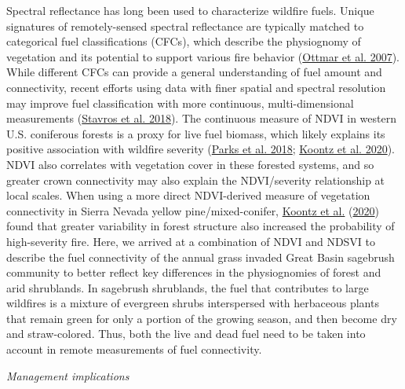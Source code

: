 \documentclass[
  12pt,
]{article}
\begin{document}
Spectral reflectance has long been used to characterize wildfire fuels.
Unique signatures of remotely-sensed spectral reflectance are typically
matched to categorical fuel classifications (CFCs), which describe the
physiognomy of vegetation and its potential to support various fire
behavior (\protect\hyperlink{ref-Ottmar2007}{Ottmar et al. 2007}). While
different CFCs can provide a general understanding of fuel amount and
connectivity, recent efforts using data with finer spatial and spectral
resolution may improve fuel classification with more continuous,
multi-dimensional measurements
(\protect\hyperlink{ref-Stavros2018}{Stavros et al. 2018}). The
continuous measure of NDVI in western U.S. coniferous forests is a proxy
for live fuel biomass, which likely explains its positive association
with wildfire severity (\protect\hyperlink{ref-Parks2018}{Parks et al.
2018}; \protect\hyperlink{ref-Koontz2020}{Koontz et al. 2020}). NDVI
also correlates with vegetation cover in these forested systems, and so
greater crown connectivity may also explain the NDVI/severity
relationship at local scales. When using a more direct NDVI-derived
measure of vegetation connectivity in Sierra Nevada yellow
pine/mixed-conifer, \protect\hyperlink{ref-Koontz2020}{Koontz et al.}
(\protect\hyperlink{ref-Koontz2020}{2020}) found that greater
variability in forest structure also increased the probability of
high-severity fire. Here, we arrived at a combination of NDVI and NDSVI
to describe the fuel connectivity of the annual grass invaded Great
Basin sagebrush community to better reflect key differences in the
physiognomies of forest and arid shrublands. In sagebrush shrublands,
the fuel that contributes to large wildfires is a mixture of evergreen
shrubs interspersed with herbaceous plants that remain green for only a
portion of the growing season, and then become dry and straw-colored.
Thus, both the live and dead fuel need to be taken into account in
remote measurements of fuel connectivity.

\emph{Management implications}
\end{document}
